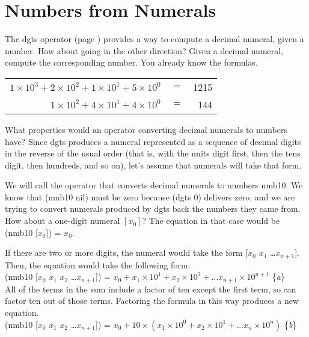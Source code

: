 \section{Numbers from Numerals}
\label{sec:numbers-from-numerals}
The dgts operator (page \pageref{dgts-defun})
provides a way to compute a decimal
numeral, given a number. How about going in the other direction?
Given a decimal numeral, compute the corresponding number.
You already know the formulas.
\begin{samepage}
\begin{center}
\begin{tabular}{rrr}
$1 \times 10^3 + 2 \times 10^2 + 1 \times 10^1 + 5 \times 10^0$ &$=$ & 1215 \\
$1 \times 10^2 + 4 \times 10^1 + 4 \times 10^0$                 &$=$ &  144 \\
\end{tabular}
\end{center}
\end{samepage}

What properties would an operator
converting decimal numerals to numbers have?
Since dgts produces a numeral represented as a sequence
of decimal digits in the reverse of the usual order
(that is, with the units digit first,
then the tens digit, then hundreds, and so on),
let's assume that numerals will take that form.

We will call the operator that converts decimal numerals to numbers nmb10.
We know that (nmb10 nil) must be zero because (dgts 0) delivers
zero, and we are trying to convert numerals produced by dgts
back the numbers they came from.
How about a one-digit numeral $[x_0]$?
The equation in that case would be (nmb10 [$x_0$]) = $x_0$.

If there are two or more digits, the numeral would take the form
[$x_0$ $x_1$ \dots $x_{n+1}$].
Then, the equation would take the following form.\\
\hspace*{1cm}
(nmb10 [$x_0$ $x_1$ $x_2$ \dots $x_{n+1}$]) =
$x_0 + x_1 \times 10^1 + x_2 \times 10^2 + \dots x_{n+1} \times 10^{n+1}$ \hfill \{\emph{a}\}\\

All of the terms in the sum
include a factor of ten except the first term,
so can factor ten out of those terms.
Factoring the formula in this way produces a new equation.\\
\hspace*{1cm}
(nmb10 [$x_0$ $x_1$ $x_2$ \dots $x_{n+1}$]) = $x_0 + 10 \times (x_1 \times 10^0 + x_2 \times 10^1 + \dots x_n \times 10^n)$ \hfill \{\emph{b}\}\\

